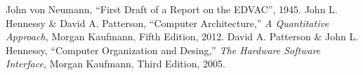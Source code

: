\begin{thebibliography}{99}

 John von Neumann, ``First Draft of a Report on the EDVAC'', 
1945.
 John L. Hennessy \& David A. Patterson, ``Computer 
Architecture,'' \emph{A Quantitative Approach,} Morgan Kaufmann, Fifth Edition, 
2012.
 David A. Patterson \& John L. Hennessy, ``Computer 
Organization and Desing,'' \emph{The Hardware Software Interface,} Morgan 
Kaufmann, Third Edition, 2005.


\end{thebibliography}
